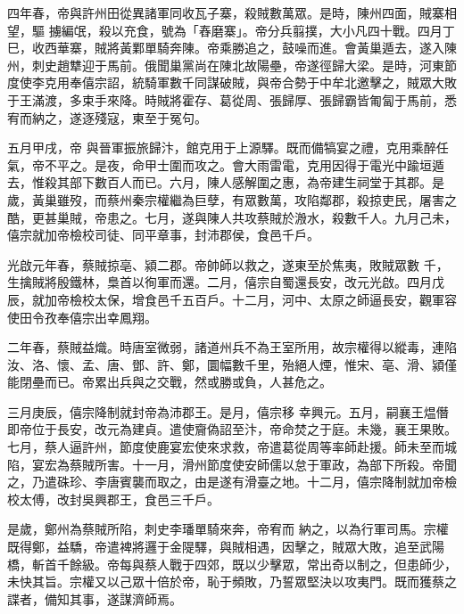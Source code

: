 \begin{pinyinscope}
 四年春，帝與許州田從異諸軍同收瓦子寨，殺賊數萬眾。是時，陳州四面，賊寨相望，驅
 擄編氓，殺以充食，號為「舂磨寨」。帝分兵翦撲，大小凡四十戰。四月丁巳，收西華寨，賊將黃鄴單騎奔陳。帝乘勝追之，鼓噪而進。會黃巢遁去，遂入陳州，刺史趙犨迎于馬前。俄聞巢黨尚在陳北故陽壘，帝遂徑歸大梁。是時，河東節度使李克用奉僖宗詔，統騎軍數千同謀破賊，與帝合勢于中牟北邀擊之，賊眾大敗于王滿渡，多束手來降。時賊將霍存、葛從周、張歸厚、張歸霸皆匍匐于馬前，悉宥而納之，遂逐殘寇，東至于冤句。



 五月甲戌，帝
 與晉軍振旅歸汴，館克用于上源驛。既而備犒宴之禮，克用乘醉任氣，帝不平之。是夜，命甲士圍而攻之。會大雨雷電，克用因得于電光中踰垣遁去，惟殺其部下數百人而已。六月，陳人感解圍之惠，為帝建生祠堂于其郡。是歲，黃巢雖歿，而蔡州秦宗權繼為巨孽，有眾數萬，攻陷鄰郡，殺掠吏民，屠害之酷，更甚巢賊，帝患之。七月，遂與陳人共攻蔡賊於溵水，殺數千人。九月己未，僖宗就加帝檢校司徒、同平章事，封沛郡侯，食邑千戶。



 光啟元年春，蔡賊掠亳、潁二郡。帝帥師以救之，遂東至於焦夷，敗賊眾數
 千，生擒賊將殷鐵林，梟首以徇軍而還。二月，僖宗自蜀還長安，改元光啟。四月戊辰，就加帝檢校太保，增食邑千五百戶。十二月，河中、太原之師逼長安，觀軍容使田令孜奉僖宗出幸鳳翔。



 二年春，蔡賊益熾。時唐室微弱，諸道州兵不為王室所用，故宗權得以縱毒，連陷汝、洛、懷、孟、唐、鄧、許、鄭，圜幅數千里，殆絕人煙，惟宋、亳、滑、潁僅能閉壘而已。帝累出兵與之交戰，然或勝或負，人甚危之。



 三月庚辰，僖宗降制就封帝為沛郡王。是月，僖宗移
 幸興元。五月，嗣襄王煴僭即帝位于長安，改元為建貞。遣使齎偽詔至汴，帝命焚之于庭。未幾，襄王果敗。七月，蔡人逼許州，節度使鹿宴宏使來求救，帝遣葛從周等率師赴援。師未至而城陷，宴宏為蔡賊所害。十一月，滑州節度使安師儒以怠于軍政，為部下所殺。帝聞之，乃遣硃珍、李唐賓襲而取之，由是遂有滑臺之地。十二月，僖宗降制就加帝檢校太傅，改封吳興郡王，食邑三千戶。



 是歲，鄭州為蔡賊所陷，刺史李璠單騎來奔，帝宥而
 納之，以為行軍司馬。宗權既得鄭，益驕，帝遣裨將邏于金隄驛，與賊相遇，因擊之，賊眾大敗，追至武陽橋，斬首千餘級。帝每與蔡人戰于四郊，既以少擊眾，常出奇以制之，但患師少，未快其旨。宗權又以己眾十倍於帝，恥于頻敗，乃誓眾堅決以攻夷門。既而獲蔡之諜者，備知其事，遂謀濟師焉。




\end{pinyinscope}
